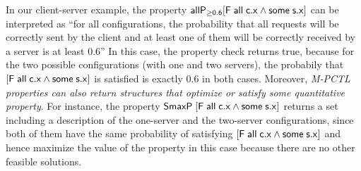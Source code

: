 \documentclass[10pt,journal,compsoc]{IEEEtran}
\begin{document}
In our client-server example, the property ${\sf allP_{\geq 0.6} [ F \; all \; c.x \wedge some \; s.x]}$ can be interpreted as ``for all configurations, the probability that all requests will be correctly sent by the client and at least one of them will be correctly received by a server is at least 0.6'' 
In this case, the property check returns true, because for the two possible configurations (with one and two servers), the probabily that ${\sf [F \; all \; c.x \wedge some \; s.x]}$ is satisfied is exactly 0.6 in both cases.
Moreover, {\it M-PCTL properties can also return structures that optimize or satisfy some quantitative property}. 
For instance, the property ${\sf SmaxP\; [ F \; all \; c.x \wedge some \; s.x]}$ returns a set including a description of the one-server and the two-server configurations, since both of them have the same probability of satisfying ${\sf [F \; all \; c.x \wedge some \; s.x]}$ and hence maximize the value of the property in this case because there are no other feasible solutions. 




\end{document}
